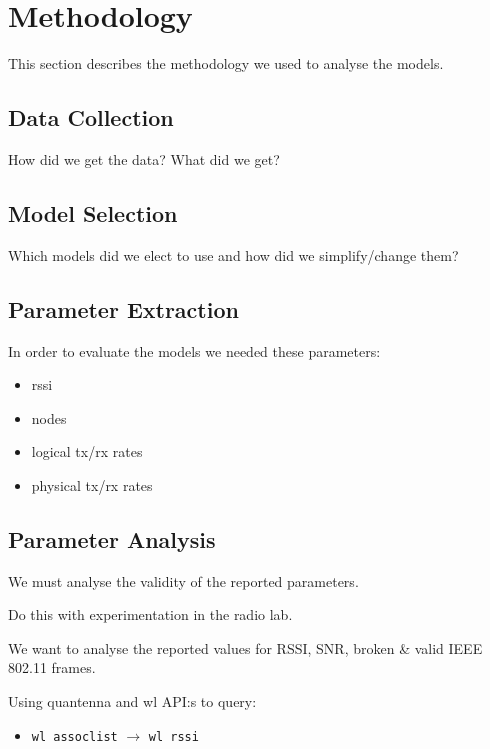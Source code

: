\chapter{Methodology}

This section describes the methodology we used to analyse the models.

\section{Data Collection}

How did we get the data? What did we get?

\section{Model Selection}

Which models did we elect to use and how did we simplify/change them?

\section{Parameter Extraction}

In order to evaluate the models we needed these parameters:

\begin{itemize}
\item rssi
\item nodes
\item logical tx/rx rates
\item physical tx/rx rates
\end{itemize}

\section{Parameter Analysis}

We must analyse the validity of the reported parameters.

Do this with experimentation in the radio lab.

We want to analyse the reported values for RSSI, SNR, broken \& valid IEEE 802.11 frames.

Using quantenna and wl API:s to query:
\begin{itemize}
    \item \texttt{wl assoclist} $\rightarrow$ \texttt{wl rssi}
\end{itemize}
